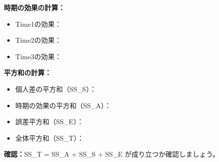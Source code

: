 \documentclass[a4paper,12pt]{ltjarticle}
\begin{document}
\textbf{時期の効果の計算：}
\begin{itemize}
	\item[] Time1の効果：\underline{\hspace{3cm}}
	\item[] Time2の効果：\underline{\hspace{3cm}}
	\item[] Time3の効果：\underline{\hspace{3cm}}
\end{itemize}

\textbf{平方和の計算：}
\begin{itemize}
	\item[] 個人差の平方和（SS\_S）：\underline{\hspace{3cm}}
	\item[] 時期の効果の平方和（SS\_A）：\underline{\hspace{3cm}}
	\item[] 誤差平方和（SS\_E）：\underline{\hspace{3cm}}
	\item[] 全体平方和（SS\_T）：\underline{\hspace{3cm}}
\end{itemize}

\textbf{確認：}SS\_T = SS\_A + SS\_S + SS\_E が成り立つか確認しましょう。
\end{document}
